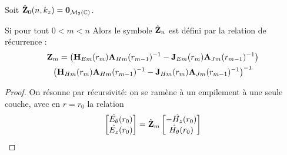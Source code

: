         \begin{thm}
            Soit $\hat {\mathbf{Z}}_0(n,k_z) = \mathbf{0}_{\mathcal{M}_2(\mathbb C)}$.

            Si pour tout $0 < m < n$
            Alors le symbole $\hat {\mathbf{Z}}_n$ est défini par la relation de récurrence : 
            \begin{multline}
                \mathbf{Z}_m = \left(\mathbf{H}_{Em}(r_m)\mathbf{A}_{Hm}(r_{m-1})^{-1} - \mathbf{J}_{Em}(r_m)\mathbf{A}_{Jm}(r_{m-1})^{-1}\right) \\
                        \left(\mathbf{H}_{Hm}(r_m)\mathbf{A}_{Hm}(r_{m-1})^{-1} - \mathbf{J}_{Hm}(r_m)\mathbf{A}_{Jm}(r_{m-1})^{-1}\right)^{-1}
            \end{multline}
        \end{thm}

        \begin{proof}

            On résonne par récursivité: on se ramène à un empilement à une seule couche, avec en $r=r_0$ la relation
            \begin{equation}
                \begin{bmatrix}
                    \hat{E_\theta}(r_0)\\
                    \hat{E_z}(r_0)\\
                \end{bmatrix}
                =
                \hat {\mathbf{Z}}_m
                \begin{bmatrix}
                    -\hat{H_z}(r_0)\\
                    \hat{H_\theta}(r_0)\\
                \end{bmatrix}
            \end{equation}


\end{proof}
